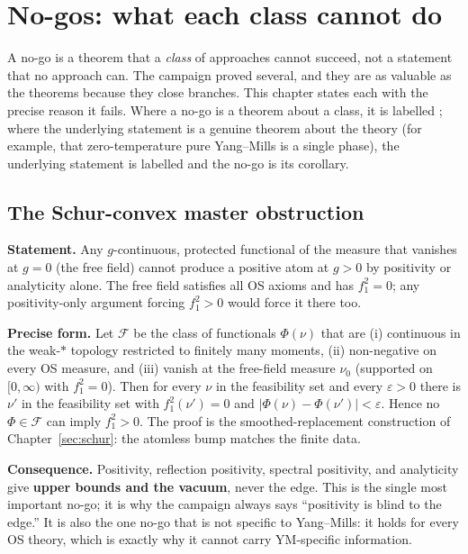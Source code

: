 \section{No-gos: what each class cannot do}
\label{sec:nogos}

A no-go is a theorem that a \emph{class} of approaches cannot succeed, not a statement that no
approach can. The campaign proved several, and they are as valuable as the theorems because they
close branches. This chapter states each with the precise reason it fails. Where a no-go is a
theorem about a class, it is labelled \LN; where the underlying statement is a genuine theorem
about the theory (for example, that zero-temperature pure Yang--Mills is a single phase), the
underlying statement is labelled \LT{} and the no-go is its corollary.

\subsection{The Schur-convex master obstruction}
\label{sec:schur-master}

\textbf{Statement.} Any $g$-continuous, protected functional of the measure that vanishes at
$g=0$ (the free field) cannot produce a positive atom at $g>0$ by positivity or analyticity
alone. The free field satisfies all OS axioms and has $f_1^2=0$; any positivity-only argument
forcing $f_1^2>0$ would force it there too.

\textbf{Precise form.} Let $\mathcal F$ be the class of functionals $\Phi(\nu)$ that are (i)
continuous in the weak-$*$ topology restricted to finitely many moments, (ii) non-negative on
every OS measure, and (iii) vanish at the free-field measure $\nu_0$ (supported on $[0,\infty)$
with $f_1^2=0$). Then for every $\nu$ in the feasibility set and every $\varepsilon>0$ there is
$\nu'$ in the feasibility set with $f_1^2(\nu')=0$ and $|\Phi(\nu)-\Phi(\nu')|<\varepsilon$.
Hence no $\Phi\in\mathcal F$ can imply $f_1^2>0$. The proof is the smoothed-replacement
construction of Chapter~\ref{sec:schur}: the atomless bump matches the finite data.

\textbf{Consequence.} Positivity, reflection positivity, spectral positivity, and analyticity
give \textbf{upper bounds and the vacuum}, never the edge. This is the single most important
no-go; it is why the campaign always says ``positivity is blind to the edge.'' It is also the
one no-go that is not specific to Yang--Mills: it holds for every OS theory, which is exactly
why it cannot carry YM-specific information.

